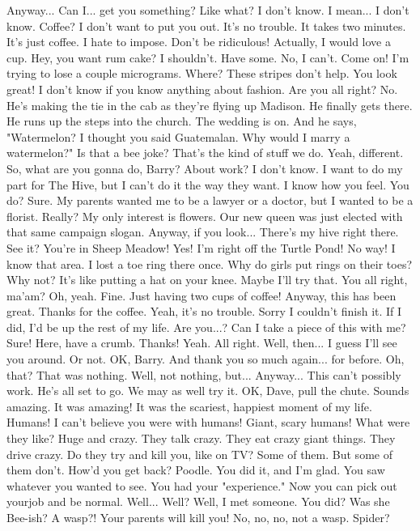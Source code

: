 \documentclass[a4paper,12pt]{article}
\begin{document}
Anyway... Can I... get you something?
Like what?
I don't know. I mean... I don't know. Coffee?
I don't want to put you out.
It's no trouble. It takes two minutes.
It's just coffee.
I hate to impose.
Don't be ridiculous!
Actually, I would love a cup.
Hey, you want rum cake?
I shouldn't.
Have some.
No, I can't.
Come on!
I'm trying to lose a couple micrograms.
Where?
These stripes don't help.
You look great!
I don't know if you know anything about fashion.
Are you all right?
No.
He's making the tie in the cab as they're flying up Madison.
He finally gets there.
He runs up the steps into the church.
The wedding is on.
And he says, "Watermelon?
I thought you said Guatemalan.
Why would I marry a watermelon?"
Is that a bee joke?
That's the kind of stuff we do.
Yeah, different.
So, what are you gonna do, Barry?
About work? I don't know.
I want to do my part for The Hive, but I can't do it the way they want.
I know how you feel.
You do?
Sure.
My parents wanted me to be a lawyer or a doctor, but I wanted to be a florist.
Really?
My only interest is flowers.
Our new queen was just elected with that same campaign slogan.
Anyway, if you look... There's my hive right there. See it?
You're in Sheep Meadow!
Yes! I'm right off the Turtle Pond!
No way! I know that area. I lost a toe ring there once.
Why do girls put rings on their toes?
Why not?
It's like putting a hat on your knee.
Maybe I'll try that.
You all right, ma'am?
Oh, yeah. Fine.
Just having two cups of coffee!
Anyway, this has been great.
Thanks for the coffee.
Yeah, it's no trouble.
Sorry I couldn't finish it. If I did, I'd be up the rest of my life.
Are you...?
Can I take a piece of this with me?
Sure! Here, have a crumb.
Thanks!
Yeah.
All right. Well, then... I guess I'll see you around. Or not.
OK, Barry.
And thank you so much again... for before.
Oh, that? That was nothing.
Well, not nothing, but... Anyway...
This can't possibly work.
He's all set to go.
We may as well try it.
OK, Dave, pull the chute.
Sounds amazing.
It was amazing!
It was the scariest, happiest moment of my life.
Humans! I can't believe you were with humans!
Giant, scary humans!
What were they like?
Huge and crazy. They talk crazy.
They eat crazy giant things.
They drive crazy.
Do they try and kill you, like on TV?
Some of them. But some of them don't.
How'd you get back?
Poodle.
You did it, and I'm glad. You saw whatever you wanted to see.
You had your "experience." Now you can pick out yourjob and be normal.
Well...
Well?
Well, I met someone.
You did? Was she Bee-ish?
A wasp?! Your parents will kill you!
No, no, no, not a wasp.
Spider?
\end{document}
